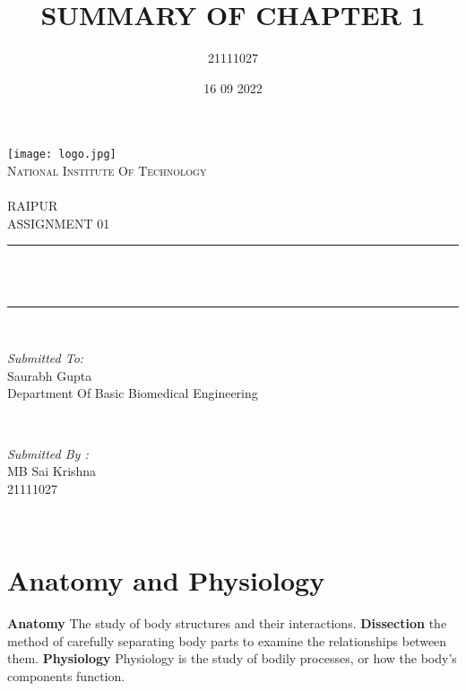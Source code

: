 \documentclass[12pt]{article}
\title{SUMMARY OF CHAPTER 1}
\author{21111027}
\date{16 09  2022}
\makeatletter
\let\thetitle\@title
\makeatother
\begin{document}
\begin{titlepage}
\centering
    \texttt{[image: logo.jpg]}\\[1.0 cm]
    \textsc{\LARGE National Institute Of Technology \newline\\\\ RAIPUR}\\[1.5 CM]
   
\textsc{\Large ASSIGNMENT 01}\\[0.5 cm] %
\rule{\linewidth}{0.4 mm} \\[0.4 cm]
{ \huge \bfseries \thetitle}\\
\rule{\linewidth}{0.4 mm} \\[1.5 cm]

\begin{minipage}{0.6\textwidth}
\begin{flushleft} \large
\emph{Submitted To:}\\
Saurabh Gupta\\
            Department Of Basic Biomedical Engineering\\
\end{flushleft}
\end{minipage}~
\begin{minipage}{0.4\textwidth}
           
\begin{flushright} \large
\emph{Submitted By :}\\
MB Sai Krishna\\
            21111027\\
\end{flushright}
       
\end{minipage}\\[2 cm]
\end{titlepage}

\tableofcontents
\pagebreak

\section{Anatomy and Physiology}
\textbf{Anatomy} The study of body structures and their interactions.\newline
\textbf{Dissection} the method of carefully separating body parts to examine the relationships between them.\newline
\textbf{Physiology} Physiology is the study of bodily processes, or how the body's components function.
\end{document}
